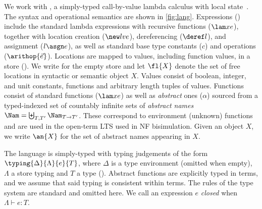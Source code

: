 We work with \lang, a simply-typed call-by-value lambda calculus with local state~\cite{KoutavasLT22}.
The syntax and operational semantics are shown in \cref{fig:lang}.
Expressions (\Exp) include the standard lambda expressions with recursive functions ($\lam x e$), together with location creation ($\new l v e$), dereferencing ($\deref l$), and assignment ($l \asgn e$), as well as standard base type constants ($c$) and operations ($\arithop{\vec e}$).
Locations are mapped to values, including function values, in a store (\St). We write \emptyS for the empty store
and let $\fl{X}$ denote the set of free locations in syntactic or semantic object $X$.
%
Values consist of boolean, integer, and unit constants, functions and arbitrary length tuples of values. Functions consist of standard functions ($\lam x e$) as well as \emph{abstract} ones ($\alpha$) sourced from a typed-indexed set of countably infinite sets of \emph{abstract names} $\Nam=\biguplus_{T,T'}\Nam_{T\to T'}$.
These correspond to environment (unknown) functions and are used in the open-term LTS used in NF bisimulation. Given an object $X$, we write $\an{X}$ for the set of abstract names appearing in $X$.


The language \lang is simply-typed with typing judgements of the form $\typing{\Delta}{\Lambda}{e}{T}$, where $\Delta$ is a type environment (omitted when empty), $\Lambda$ a store typing and $T$ a type (\Typ).
Abstract functions are explicitly typed in terms, and we assume that said typing is consistent within terms.
The rules of the type system are standard and omitted here. We call an expression $e$ \emph{closed} when $\Lambda\vdash e:T$.

